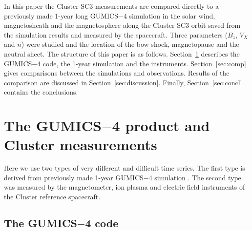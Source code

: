 \documentclass[linenumbers,draft]{agujournal}
\begin{document}
In this paper the Cluster SC3 measurements are compared directly to a previously made 1-year long GUMICS$-$4 simulation in the solar wind, magnetosheath and the magnetosphere along the Cluster SC3 orbit saved from the simulation results and measured by the spacecraft. Three parameters ($B_z$, $V_X$ and $n$) were studied and the location of the bow shock, magnetopause and the neutral sheet. The structure of this paper is as follows. Section~\ref{sec:data} describes the GUMICS$-$4 code, the 1-year simulation and the instruments. Section~\ref{sec:comp} gives comparisons between the simulations and observations. Results of the comparison are discussed in Section~\ref{sec:discussion}. Finally, Section~\ref{sec:concl} contains the conclusions.

\section{The GUMICS$-$4 product and Cluster measurements}
\label{sec:data}

Here we use two types of very different and difficult time series. The first type is derived from previously made 1-year GUMICS$-$4 simulation \citep{facsko16:_one_earth}. The second type was measured by the magnetometer, ion plasma and electric field instruments of the Cluster reference spacecraft.

\subsection{The GUMICS$-$4 code}
\label{sec:gumics}
\end{document}

